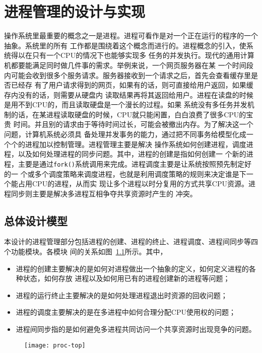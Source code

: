 \documentclass{swfuthesism}
\begin{document}
\chapter{进程管理的设计与实现}

操作系统里最重要的概念之一是进程。进程可看作是对一个正在运行的程序的一个抽象。系统里的所有
工作都是围绕着这个概念而进行的。进程概念的引入，使系统得以在只有一个CPU的情况下也能够实现多
任务的并发执行。现代的通用计算机都要能满足同时做几件事的需求。举例来说，一个网页服务器在某
一个时间段内可能会收到很多个服务请求。服务器接收到一个请求之后，首先会查看缓存里是否已经存
有了用户请求得到的网页，如果有的话，则可直接给用户返回，如果缓存内没有的话，则需要从硬盘内
读取结果再将其返回给用户。进程在读盘的时候是用不到CPU的，而且读取硬盘是一个漫长的过程。如果
系统没有多任务并发机制的话，在某进程读取硬盘的时候，CPU就只能闲置，白白浪费了很多CPU的宝贵
时间。并且别的请求由于等待时间过长，可能会被撤出内存。为了解决这一个问题，计算机系统必须具
备处理并发事务的能力，通过把不同事务给模型化成一个个的进程加以控制管理。进程管理主要是解决
操作系统如何创建进程，调度进程，以及如何处理进程的同步问题。其中，进程的创建是指如何创建一
个新的进程，主要是通过\texttt{fork()}系统调用来完成。进程调度主要是让系统按照预先制定好的一
个或多个调度策略来调度进程，也就是利用调度策略的规则来决定谁是下一个能占用CPU的进程，从而实
现让多个进程以时分复用的方式共享CPU资源。进程同步则主要是解决多进程互相争夺共享资源时产生的
冲突。

\section{总体设计模型}

本设计的进程管理部分包括进程的创建、进程的终止、进程调度、进程间同步等四个功能模块。各模块
间的关系如图~\ref{fig:proc-top}所示。其中，
\begin{itemize}
\item 进程的创建主要解决的是如何对进程做出一个抽象的定义，如何定义进程的各种状态，如何存放
  进程以及如何用已有的进程创建新的进程等问题；
\item 进程的运行终止主要解决的是如何处理进程退出时资源的回收问题；
\item 进程的调度主要解决的是在多进程中如何合理分配CPU使用权的问题；
\item 进程间同步指的是如何避免多进程共同访问一个共享资源时出现竞争的问题。
\end{itemize}

\begin{figure}[h]
  \centering
  \begin{center}
    \texttt{[image: proc-top]}
  \end{center}
  \label{fig:proc-top}
\end{figure}
\end{document}
